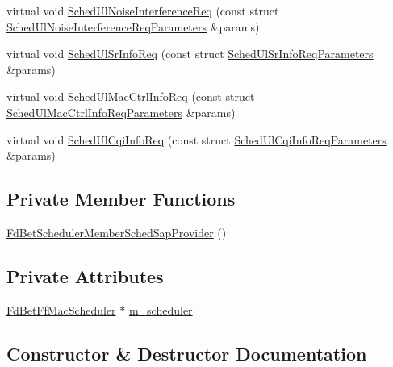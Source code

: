 \begin{DoxyCompactItemize}
\item 
virtual void \hyperlink{classns3_1_1FdBetSchedulerMemberSchedSapProvider_a146f70f9aee7d371b8f203484f842be1}{Sched\+Ul\+Noise\+Interference\+Req} (const struct \hyperlink{structns3_1_1FfMacSchedSapProvider_1_1SchedUlNoiseInterferenceReqParameters}{Sched\+Ul\+Noise\+Interference\+Req\+Parameters} \&params)
\item 
virtual void \hyperlink{classns3_1_1FdBetSchedulerMemberSchedSapProvider_a00e4a59d695578e2dfbd6af3523101f7}{Sched\+Ul\+Sr\+Info\+Req} (const struct \hyperlink{structns3_1_1FfMacSchedSapProvider_1_1SchedUlSrInfoReqParameters}{Sched\+Ul\+Sr\+Info\+Req\+Parameters} \&params)
\item 
virtual void \hyperlink{classns3_1_1FdBetSchedulerMemberSchedSapProvider_a13831698754e06a7346a2d1d785b923f}{Sched\+Ul\+Mac\+Ctrl\+Info\+Req} (const struct \hyperlink{structns3_1_1FfMacSchedSapProvider_1_1SchedUlMacCtrlInfoReqParameters}{Sched\+Ul\+Mac\+Ctrl\+Info\+Req\+Parameters} \&params)
\item 
virtual void \hyperlink{classns3_1_1FdBetSchedulerMemberSchedSapProvider_ac48b0d15e820281aed14ab8edc639992}{Sched\+Ul\+Cqi\+Info\+Req} (const struct \hyperlink{structns3_1_1FfMacSchedSapProvider_1_1SchedUlCqiInfoReqParameters}{Sched\+Ul\+Cqi\+Info\+Req\+Parameters} \&params)
\end{DoxyCompactItemize}
\subsection*{Private Member Functions}
\begin{DoxyCompactItemize}
\item 
\hyperlink{classns3_1_1FdBetSchedulerMemberSchedSapProvider_ab5fa03cae85979aec56339cb3a2ad39d}{Fd\+Bet\+Scheduler\+Member\+Sched\+Sap\+Provider} ()
\end{DoxyCompactItemize}
\subsection*{Private Attributes}
\begin{DoxyCompactItemize}
\item 
\hyperlink{classns3_1_1FdBetFfMacScheduler}{Fd\+Bet\+Ff\+Mac\+Scheduler} $\ast$ \hyperlink{classns3_1_1FdBetSchedulerMemberSchedSapProvider_a292f5d9506cae338100d35a1ddb4cf94}{m\+\_\+scheduler}
\end{DoxyCompactItemize}


\subsection{Constructor \& Destructor Documentation}
